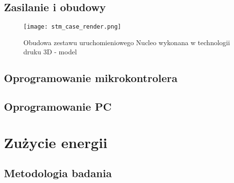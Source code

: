 \subsection{Zasilanie i obudowy}

\begin{figure}[!htb]
	\centering \texttt{[image: stm\_case\_render.png]}
	\caption{Obudowa zestawu uruchomieniowego Nucleo wykonana w technologii druku 3D - model}
	\label{rys:obudowa_model3d}
\end{figure}

\subsection{Oprogramowanie mikrokontrolera}

\subsection{Oprogramowanie PC}


\section{Zużycie energii}

\subsection{Metodologia badania}

